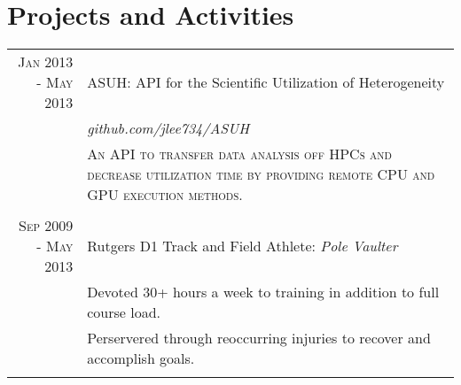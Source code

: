 \documentclass[a4paper,10pt, onepage]{article} %
\begin{document}
\section{Projects and Activities}

\begin{tabular}{rp{10cm}}
\textsc{Jan 2013 - May 2013} & ASUH: API for the Scientific Utilization of Heterogeneity\\
& \small\emph{github.com/jlee734/ASUH}\\
& \small\textsc{An API to transfer data analysis off HPCs and decrease utilization time by providing remote CPU and GPU execution methods.}\\
\multicolumn{2}{c}{}\\

\textsc{Sep 2009 - May 2013} & Rutgers D1 Track and Field Athlete: \emph{Pole Vaulter}\\
& \small{Devoted 30+ hours a week to training in addition to full course load.}\\
& \small{Perservered through reoccurring injuries to recover and accomplish goals.}\\
\multicolumn{2}{c}{}\\


\end{tabular}




\end{document}
